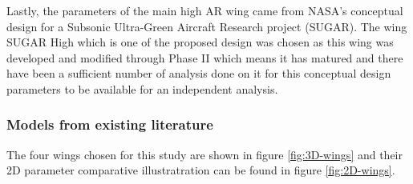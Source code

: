 \documentclass[11pt]{article}
\begin{document}
Lastly, the parameters of the main high AR wing came from NASA's conceptual design for a Subsonic Ultra-Green Aircraft Research project \cite{Bradley2011SubsonicReport}\cite{Bradley2012SubsonicDevelopment}\cite{Bradley2011SubsonicReport} (SUGAR). The wing SUGAR High which is one of the proposed design was chosen as this wing was developed and modified through Phase II which means it has matured and there have been a sufficient number of analysis done on it for this conceptual design parameters to be available for an independent analysis.

\subsubsection{Models from existing literature}
The four wings chosen for this study are shown in figure \ref{fig:3D-wings} and their 2D parameter comparative illustratration can be found in figure \ref{fig:2D-wings}.\\
\end{document}
